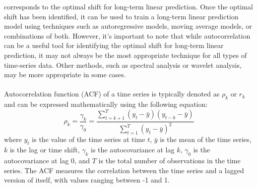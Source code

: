 corresponds to the optimal shift for long-term linear prediction. Once the optimal shift has been identified, it can
be used to train a long-term linear prediction model using techniques such as autoregressive models, moving average
models, or combinations of both. However, it's important to note that while autocorrelation can be a useful tool for
identifying the optimal shift for long-term linear prediction, it may not always be the most appropriate technique for
all types of time-series data. Other methods, such as spectral analysis or wavelet analysis, may be more
appropriate in some cases.\\
\\
Autocorrelation function (ACF) of a time series is typically denoted as $\rho_k$ or $r_k$ and can be expressed
mathematically using the following equation:
\begin{equation}
    \rho_k = \frac{\gamma_k}{\gamma_0} = \frac{\sum_{t=k+1}^{T}(y_t - \bar{y})(y_{t-k} - \bar{y})}{\sum_{t=1}^{T}(y_t - \bar{y})^2}
\end{equation}
where $y_t$ is the value of the time series at time $t$, $\bar{y}$ is the mean of the time series, $k$ is the lag or
time shift, $\gamma_k$ is the autocovariance at lag $k$, $\gamma_0$ is the autocovariance at lag 0, and $T$ is the total number
of observations in the time series. The ACF measures the correlation between the time series and a lagged version of
itself, with values ranging between -1 and 1.

